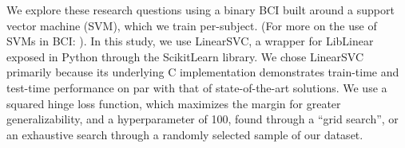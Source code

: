 We explore these research questions using a binary BCI built around a support vector machine (SVM), which we train per-subject. (For more on the use of SVMs in BCI: \cite{garrett_comparison_2003,grierson_better_2011}). In this study, we use LinearSVC, \cite{fan_liblinear:_2008} a wrapper for LibLinear exposed in Python through the ScikitLearn library. \cite{pedregosa_scikit-learn:_2011} We chose LinearSVC primarily because its underlying C implementation demonstrates train-time and test-time performance on par with that of state-of-the-art solutions. \cite{fan_liblinear:_2008} We use a squared hinge loss function, which maximizes the margin for greater generalizability, and a hyperparameter of 100, found through a ``grid search'', or an exhaustive search through a randomly selected sample of our dataset. 

